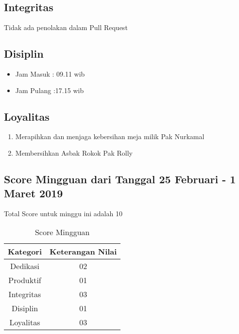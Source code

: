 \subsection{Integritas}
Tidak ada penolakan dalam Pull Request
\subsection{Disiplin}
\begin{itemize}
\item Jam Masuk : 09.11 wib
\item Jam Pulang :17.15 wib
\end{itemize}
\subsection{Loyalitas}
\begin{enumerate}
\item Merapihkan dan menjaga kebersihan meja milik Pak Nurkamal
\item Membersihkan Asbak Rokok Pak Rolly
\end{enumerate}

\subsection{Score Mingguan dari Tanggal 25 Februari - 1 Maret 2019}
Total Score untuk minggu ini adalah 10

\begin{table}[h]
\caption{Score Mingguan}
\centering
\begin{tabular}{|c|c|}
\hline
\textbf{Kategori}&\textbf{Keterangan Nilai}\\
\hline
Dedikasi&02\\
\hline
Produktif&01\\
\hline
Integritas&03\\
\hline
Disiplin&01\\
\hline
Loyalitas&03\\
\hline
\end{tabular}
\label{table:score mingguan}
\end{table}